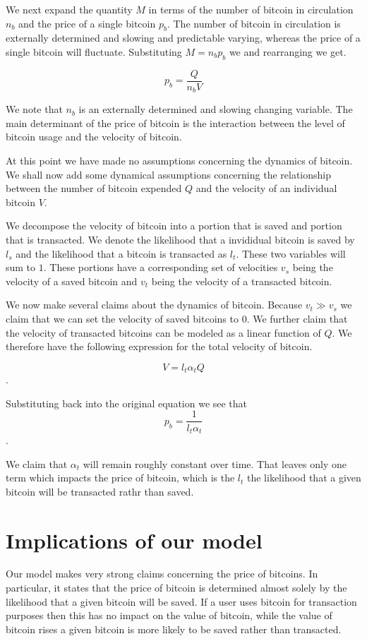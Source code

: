 \documentclass[12pt]{article}
\begin{document}
We next expand the quantity $M$ in terms of the number of bitcoin in
circulation $n_b$ and the price of a single bitcoin $p_b$.  The number
of bitcoin in circulation is externally determined and slowing and
predictable varying, whereas the price of a single bitcoin will
fluctuate.  Substituting $M=n_b p_b$ we and rearranging we get.

\begin{equation}
p_b = \frac{Q}{n_b V}
\end{equation}

We note that $n_b$ is an externally determined and slowing changing
variable.  The main determinant of the price of bitcoin is the
interaction between the level of bitcoin usage and the velocity of
bitcoin.

At this point we have made no assumptions concerning the dynamics of
bitcoin.  We shall now add some dynamical assumptions concerning the
relationship between the number of bitcoin expended $Q$ and the
velocity of an individual bitcoin $V$.

We decompose the velocity of bitcoin into a portion that is saved and
portion that is transacted.  We denote the likelihood that a
invididual bitcoin is saved by $l_s$ and the likelihood that a bitcoin
is transacted as $l_t$.  These two variables will sum to $1$.  These
portions have a corresponding set of velocities $v_s$ being the
velocity of a saved bitcoin and $v_t$ being the velocity of a
transacted bitcoin.

We now make several claims about the dynamics of bitcoin.  Because
$v_t \gg v_s$ we claim that we can set the velocity of saved bitcoins
to $0$.  We further claim that the velocity of transacted bitcoins can
be modeled as a linear function of $Q$.  We therefore have the
following expression for the total velocity of bitcoin.

\begin{equation}
V = l_t\alpha_t Q
\end{equation}.

Substituting back into the original equation we see that
\begin{equation}
p_b = \frac{1}{l_t \alpha_t}
\end{equation}.

We claim that $\alpha_t$ will remain roughly constant over time.  That
leaves only one term which impacts the price of bitcoin, which is the
$l_t$ the likelihood that a given bitcoin will be transacted rathr
than saved.

\section{Implications of our model}
Our model makes very strong claims concerning the price of bitcoins.
In particular, it states that the price of bitcoin is determined
almost solely by the likelihood that a given bitcoin will be saved. If
a user uses bitcoin for transaction purposes then this has no impact
on the value of bitcoin, while the value of bitcoin rises a given
bitcoin is more likely to be saved rather than transacted.
\end{document}
